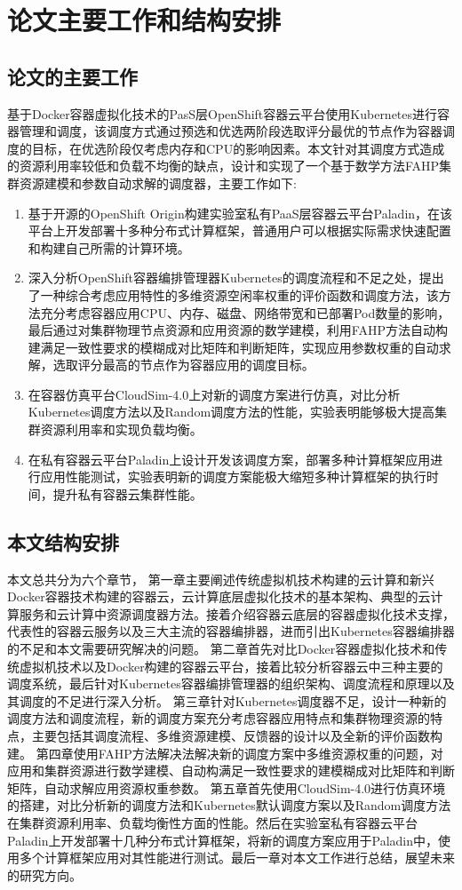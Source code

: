 \section{论文主要工作和结构安排}
\subsection{论文的主要工作}
基于Docker容器虚拟化技术的PasS层OpenShift容器云平台使用Kubernetes进行容器管理和调度，该调度方式通过预选和优选两阶段选取评分最优的节点作为容器调度的目标，在优选阶段仅考虑内存和CPU的影响因素。本文针对其调度方式造成的资源利用率较低和负载不均衡的缺点，设计和实现了一个基于数学方法FAHP集群资源建模和参数自动求解的调度器，主要工作如下:
 \begin{enumerate}[(1)]
	\item 基于开源的OpenShift Origin构建实验室私有PaaS层容器云平台Paladin，在该平台上开发部署十多种分布式计算框架，普通用户可以根据实际需求快速配置和构建自己所需的计算环境。
	\item 深入分析OpenShift容器编排管理器Kubernetes的调度流程和不足之处，提出了一种综合考虑应用特性的多维资源空闲率权重的评价函数和调度方法，该方法充分考虑容器应用CPU、内存、磁盘、网络带宽和已部署Pod数量的影响，最后通过对集群物理节点资源和应用资源的数学建模，利用FAHP方法自动构建满足一致性要求的模糊成对比矩阵和判断矩阵，实现应用参数权重的自动求解，选取评分最高的节点作为容器应用的调度目标。
	\item 在容器仿真平台CloudSim-4.0上对新的调度方案进行仿真，对比分析Kubernetes调度方法以及Random调度方法的性能，实验表明能够极大提高集群资源利用率和实现负载均衡。
	\item 在私有容器云平台Paladin上设计开发该调度方案，部署多种计算框架应用进行应用性能测试，实验表明新的调度方案能极大缩短多种计算框架的执行时间，提升私有容器云集群性能。
\end{enumerate}

\subsection{本文结构安排}
本文总共分为六个章节，
第一章主要阐述传统虚拟机技术构建的云计算和新兴Docker容器技术构建的容器云，云计算底层虚拟化技术的基本架构、典型的云计算服务和云计算中资源调度器方法。接着介绍容器云底层的容器虚拟化技术支撑，代表性的容器云服务以及三大主流的容器编排器，进而引出Kubernetes容器编排器的不足和本文需要研究解决的问题。
第二章首先对比Docker容器虚拟化技术和传统虚拟机技术以及Docker构建的容器云平台，接着比较分析容器云中三种主要的调度系统，最后针对Kubernetes容器编排管理器的组织架构、调度流程和原理以及其调度的不足进行深入分析。
第三章针对Kubernetes调度器不足，设计一种新的调度方法和调度流程，新的调度方案充分考虑容器应用特点和集群物理资源的特点，主要包括其调度流程、多维资源建模、反馈器的设计以及全新的评价函数构建。
第四章使用FAHP方法解决法解决新的调度方案中多维资源权重的问题，对应用和集群资源进行数学建模、自动构满足一致性要求的建模糊成对比矩阵和判断矩阵，自动求解应用资源权重参数。
第五章首先使用CloudSim-4.0进行仿真环境的搭建，对比分析新的调度方法和Kubernetes默认调度方案以及Random调度方法在集群资源利用率、负载均衡性方面的性能。然后在实验室私有容器云平台Paladin上开发部署十几种分布式计算框架，将新的调度方案应用于Paladin中，使用多个计算框架应用对其性能进行测试。最后一章对本文工作进行总结，展望未来的研究方向。

